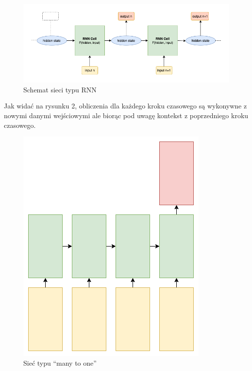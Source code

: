 \begin{figure}[!ht]
\includegraphics[width=\linewidth]{./images/rnn.png}
\caption{Schemat sieci typu RNN}
\label{fig:test3}
\end{figure}
Jak widać na rysunku 2, obliczenia dla każdego kroku czasowego są wykonywne z nowymi danymi wejściowymi
ale biorąc pod uwagę kontekst z poprzedniego kroku czasowego. 
\begin{figure}
\vspace{-4mm}
\includegraphics[width=\linewidth]{./images/many-to-one.png}
\caption{Sieć typu ``many to one''}
\label{fig:test3}
\vspace{-4mm}
\end{figure}
